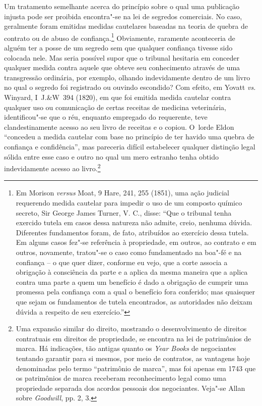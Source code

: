 Um tratamento semelhante acerca do princípio sobre o qual uma publicação
injusta pode ser proibida encontra"-se na lei de segredos comerciais. No
caso, geralmente foram emitidas medidas cautelares baseadas na teoria de
quebra de contrato ou de abuso de confiança.\footnote{Em Morison
  \emph{versus} Moat, 9 Hare, 241, 255 (1851), uma ação judicial
  requerendo medida cautelar para impedir o uso de um composto químico
  secreto, Sir George James Turner, V. C., disse: ``Que o tribunal tenha
  exercido tutela em casos dessa natureza não admite, creio, nenhuma
  dúvida. Diferentes fundamentos foram, de fato, atribuídos ao exercício
  dessa tutela. Em alguns casos fez"-se referência à propriedade, em
  outros, ao contrato e em outros, novamente, tratou"-se o caso como
  fundamentado na boa"-fé e na confiança -- o que quer dizer, conforme eu
  vejo, que a corte associa a obrigação à consciência da parte e a
  aplica da mesma maneira que a aplica contra uma parte a quem um
  benefício é dado a obrigação de cumprir uma promessa pela confiança
  com a qual o benefício fora conferido; mas quaisquer que sejam os
  fundamentos de tutela encontrados, as autoridades não deixam dúvida a
  respeito de seu exercício.''} Obviamente, raramente aconteceria de
alguém ter a posse de um segredo sem que qualquer confiança tivesse sido
colocada nele. Mas seria possível supor que o tribunal hesitaria em
conceder qualquer medida contra aquele que obteve seu conhecimento
através de uma transgressão ordinária, por exemplo, olhando
indevidamente dentro de um livro no qual o segredo foi registrado ou
ouvindo escondido? Com efeito, em Yovatt \emph{vs.} Winyard, I~J.\&W~394
(1820), em que foi emitida medida cautelar contra qualquer uso ou
comunicação de certas receitas de medicina veterinária, identificou"-se
que o réu, enquanto empregado do requerente, teve clandestinamente
acesso ao seu livro de receitas e o copiou. O~lorde Eldon ``concedeu a
medida cautelar com base no princípio de ter havido uma quebra de
confiança e confidência'', mas pareceria difícil estabelecer qualquer
distinção legal sólida entre esse caso e outro no qual um mero estranho
tenha obtido indevidamente acesso ao livro.\footnote{Uma expansão
  similar do direito, mostrando o desenvolvimento de direitos
  contratuais em direitos de propriedade, se encontra na lei de
  patrimônios de marca. Há indicações, tão antigas quanto os \emph{Year
  Books} de negociantes tentando garantir para si mesmos, por meio de
  contratos, as vantagens hoje denominadas pelo termo ``patrimônio de
  marca'', mas foi apenas em 1743 que os patrimônios de marca receberam
  reconhecimento legal como uma propriedade separada dos acordos
  pessoais dos negociantes. Veja"-se Allan sobre \emph{Goodwill}, pp. 2,
  3.}

